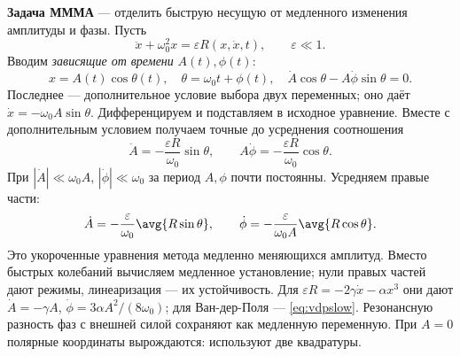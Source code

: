 \textbf{Задача МММА} --- отделить быструю несущую от медленного изменения амплитуды и фазы. Пусть
\begin{equation}\label{eq:averagebase}
 \ddot x+\omega_0^2x=\varepsilon R(x,\dot x,t),\qquad \varepsilon\ll1.
\end{equation}
Вводим \emph{зависящие от времени} $A(t),\phi(t)$:
\begin{equation}
 x=A(t)\cos\theta(t),\quad\theta=\omega_0t+\phi(t),\quad
 \dot A\cos\theta-A\dot\phi\sin\theta=0.
\end{equation}
Последнее --- дополнительное условие выбора двух переменных; оно даёт $\dot x=-\omega_0A\sin\theta$. Дифференцируем и подставляем в исходное уравнение. Вместе с дополнительным условием получаем точные до усреднения соотношения
\begin{equation}
 \dot A=-\frac{\varepsilon R}{\omega_0}\sin\theta,\qquad
 A\dot\phi=-\frac{\varepsilon R}{\omega_0}\cos\theta.
\end{equation}
При $|\dot A|\ll\omega_0A$, $|\dot\phi|\ll\omega_0$ за период $A,\phi$ почти постоянны. Усредняем правые части:
\begin{equation}\label{eq:averaged}
 \dot A=-\frac{\varepsilon}{\omega_0}\avg{R\sin\theta},\qquad
 \dot\phi=-\frac{\varepsilon}{\omega_0 A}\avg{R\cos\theta}.
\end{equation}
Это укороченные уравнения метода медленно меняющихся амплитуд. Вместо быстрых колебаний вычисляем медленное установление; нули правых частей дают режимы, линеаризация --- их устойчивость. Для $\varepsilon R=-2\gamma\dot x-\alpha x^3$ они дают $\dot A=-\gamma A$, $\dot\phi=3\alpha A^2/(8\omega_0)$; для Ван-дер-Поля --- \eqref{eq:vdpslow}. Резонансную разность фаз с внешней силой сохраняют как медленную переменную. При $A=0$ полярные координаты вырождаются: используют две квадратуры.
